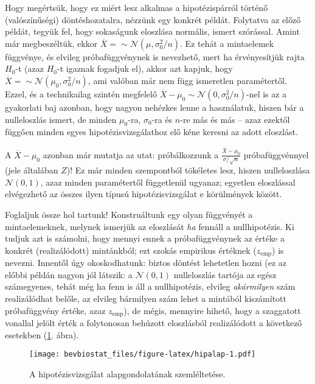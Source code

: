 \documentclass[]{book}
\begin{document}
Hogy megértsük, hogy ez miért lesz alkalmas a hipotézispárról történő
(valószínűségi) döntéshozatalra, nézzünk egy konkrét példát. Folytatva
az előző példát, tegyük fel, hogy sokaságunk eloszlása normális, ismert
szórással. Amint már megbeszéltük, ekkor
\(\overline{X}= \sim \mathcal{N}\left(\mu,\sigma_0^2/n\right)\). Ez
tehát a mintaelemek függvénye, és elvileg próbafüggvénynek is nevezhető,
mert ha érvényesítjük rajta \(H_0\)-t (azaz \(H_0\)-t igaznak fogadjuk
el), akkor azt kapjuk, hogy
\(\overline{X}= \sim \mathcal{N}\left(\mu_0,\sigma_0^2/n\right)\), ami
valóban már nem függ ismeretlen paramétertől. Ezzel, és a technikailag
szintén megfelelő
\(\overline{X}-\mu_0\sim \mathcal{N}\left(0,\sigma_0^2/n\right)\)-nel is
az a gyakorlati baj azonban, hogy nagyon nehézkes lenne a használatuk,
hiszen bár a nulleloszlás ismert, de minden \(\mu_0\)-ra,
\(\sigma_0\)-ra és \(n\)-re más és más -- azaz ezektől függően minden
egyes hipotézisvizsgálathoz elő kéne keresni az adott eloszlást.

A \(\overline{X}-\mu_0\) azonban már mutatja az utat: próbálkozzunk a
\(\frac{\overline{X}-\mu_0}{\sigma/\sqrt{n}}\) próbafüggvénnyel (jele
általában \(Z\))! Ez már minden szempontból tökéletes lesz, hiszen
nulleloszlása \(\mathcal{N}\left(0,1\right)\), azaz minden paramétertől
függetlenül ugyanaz; egyetlen eloszlással elvégezhető az összes ilyen
típusú hipotézisvizsgálat e körülmények között.

Foglaljuk össze hol tartunk! Konstruáltunk egy olyan függvényét a
mintaelemeknek, melynek ismerjük az eloszlását \emph{ha} fennáll a
nullhipotézis. Ki tudjuk azt is számolni, hogy mennyi ennek a
próbafüggvénynek az értéke a konkrét (realizálódott) mintánkból; ezt
szokás empirikus értéknek (\(z_{\mathrm{emp}}\)) is nevezni. Innentől
úgy okoskodhatunk: biztos döntést lehetetlen hozni (ez az előbbi példán
nagyon jól látszik: a \(\mathcal{N}\left(0,1\right)\) nulleloszlás
tartója az egész számegyenes, tehát még ha fenn is áll a nullhipotézis,
elvileg \emph{akármilyen} szám realizálódhat belőle, az elvileg
bármilyen szám lehet a mintából kiszámított próbafüggvény értéke, azaz
\(z_{\mathrm{emp}}\)), de mégis, mennyire hihető, hogy a szaggatott
vonallal jelölt érték a folytonosan behúzott eloszlásból realizálódott a
következő esetekben (\ref{fig:hipalap}. ábra).

\begin{figure}
\centering
\texttt{[image: bevbiostat\_files/figure-latex/hipalap-1.pdf]}
\caption{\label{fig:hipalap}A hipotézisvizsgálat alapgondolatának
szemléltetése.}
\end{figure}
\end{document}
